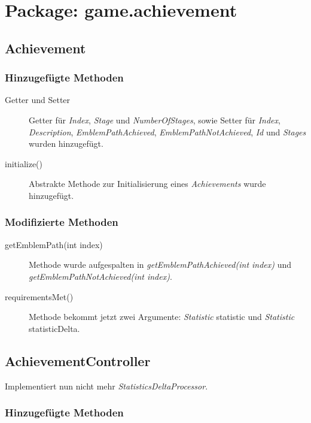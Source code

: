 \section{Package: game.achievement}

\subsection{Achievement}

\subsubsection{Hinzugefügte Methoden}

\begin{description}
	\item[Getter und Setter]
	Getter für \emph{Index}, \emph{Stage} und \emph{NumberOfStages}, sowie Setter für \emph{Index}, \emph{Description}, \emph{EmblemPathAchieved}, \emph{EmblemPathNotAchieved}, \emph{Id} und \emph{Stages} wurden hinzugefügt.
	
	\item[initialize()]
	Abstrakte Methode zur Initialisierung eines \emph{Achievements} wurde hinzugefügt.

	
\end{description}



\subsubsection{Modifizierte Methoden}

\begin{description}
	\item[getEmblemPath(int index)]
	Methode wurde aufgespalten in \emph{getEmblemPathAchieved(int index)} und \emph{getEmblemPathNotAchieved(int index)}.
	
	\item[requirementsMet()]
	Methode bekommt jetzt zwei Argumente: \emph{Statistic} statistic und \emph{Statistic} statisticDelta.
\end{description}


\subsection{AchievementController}
Implementiert nun nicht mehr \emph{StatisticsDeltaProcessor}.

\subsubsection{Hinzugefügte Methoden}

